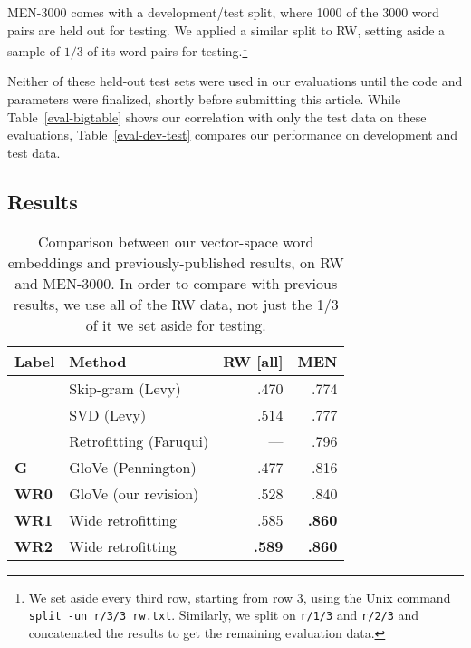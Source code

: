 \documentclass[11pt,letterpaper]{article}
\begin{document}
MEN-3000 comes with a development/test split, where 1000 of the 3000 word pairs
are held out for testing. We applied a similar split to RW, setting aside a
sample of $1/3$ of its word pairs for testing.\footnote{
    We set aside every third row, starting from row 3, using the Unix command
    {\tt split -un r/3/3 rw.txt}. Similarly, we split on {\tt r/1/3} and
    {\tt r/2/3} and concatenated the results to get the remaining evaluation
    data.
}

Neither of these held-out test sets were used in our evaluations until the code
and parameters were finalized, shortly before submitting this article. While
Table~\ref{eval-bigtable} shows our correlation with only the test data on these
evaluations, Table~\ref{eval-dev-test} compares our performance on development
and test data.

\subsection{Results}


\begin{table}[t]
\centering
\begin{tabular}{llrr}
\toprule
Label     & Method                 & RW [all] &      MEN \\
\midrule
          & Skip-gram (Levy)       &     .470 &     .774 \\
          & SVD (Levy)             &     .514 &     .777 \\
          & Retrofitting (Faruqui) &      --- &     .796 \\
\bf G     & GloVe (Pennington)     &     .477 &     .816 \\
\bf WR0   & GloVe (our revision)   &     .528 &     .840 \\
\bf WR1   & Wide retrofitting      &     .585 &{\bf .860}\\
\bf WR2   & Wide retrofitting      &{\bf .589}&{\bf .860}\\
\bottomrule
\end{tabular}

\caption{
    Comparison between our vector-space word embeddings and previously-published
    results, on RW and MEN-3000. In order to compare with previous results, we
    use all of the RW data, not just the 1/3 of it we set aside for testing.
}
\label{compare-others}
\end{table}
\end{document}

